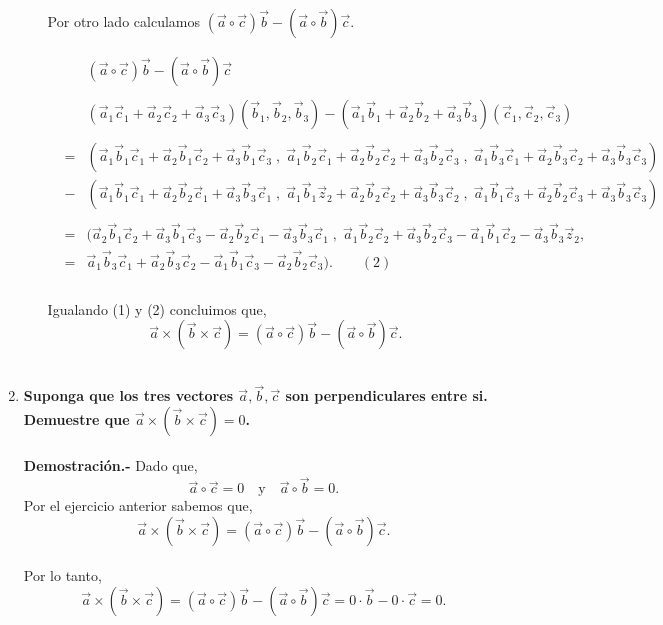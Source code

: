\begin{enumerate}
\begin{enumerate}[a)]
		Por otro lado calculamos $\left(\vec{a}\circ \vec{c}\right)\vec{b}-\left(\vec{a}\circ \vec{b}\right)\vec{c}$.

		$$\begin{array}{rcl}
		    &&\left(\vec{a}\circ \vec{c}\right)\vec{b}-\left(\vec{a}\circ \vec{b}\right)\vec{c}\\\\
		    &&(\vec{a}_1\vec{c}_1+\vec{a}_2\vec{c}_2+\vec{a}_3\vec{c}_3)(\vec{b}_1,\vec{b}_2,\vec{b}_3)-(\vec{a}_1\vec{b}_1+\vec{a}_2\vec{b}_2+\vec{a}_3\vec{b}_3)(\vec{c}_1,\vec{c}_2,\vec{c}_3)\\\\
		    &=& (\vec{a}_1\vec{b}_1\vec{c}_1+\vec{a}_2\vec{b}_1\vec{c}_2+\vec{a}_3\vec{b}_1\vec{c}_3\; ,\; \vec{a}_1\vec{b}_2\vec{c}_1+\vec{a}_2\vec{b}_2\vec{c}_2+\vec{a}_3\vec{b}_2\vec{c}_3\; , \; \vec{a}_1\vec{b}_3 \vec{c}_1+\vec{a}_2\vec{b}_3\vec{c}_2+\vec{a}_3\vec{b}_3\vec{c}_3)\\
		    &-&(\vec{a}_1\vec{b}_1\vec{c}_1+\vec{a}_2\vec{b}_2\vec{c}_1+\vec{a}_3\vec{b}_3\vec{c}_1\; , \; \vec{a}_1\vec{b}_1\vec{z}_2+\vec{a}_2\vec{b}_2\vec{c}_2+\vec{a}_3\vec{b}_3\vec{c}_2\; ,\; \vec{a}_1\vec{b}_1\vec{c}_3+\vec{a}_2\vec{b}_2\vec{c}_3+\vec{a}_3\vec{b}_3\vec{c}_3)\\\\
		    &=&(\vec{a}_2\vec{b}_1\vec{c}_2+\vec{a}_3\vec{b}_1\vec{c}_3-\vec{a}_2\vec{b}_2\vec{c}_1-\vec{a}_3\vec{b}_3\vec{c}_1\; , \; \vec{a}_1\vec{b}_2\vec{c}_2+\vec{a}_3\vec{b}_2\vec{c}_3-\vec{a}_1\vec{b}_1\vec{c}_2-\vec{a}_3\vec{b}_3\vec{z}_2 ,\\
		    &=& \vec{a}_1\vec{b}_3\vec{c}_1+ \vec{a}_2\vec{b}_3\vec{c}_2-\vec{a}_1\vec{b}_1\vec{c}_3- \vec{a}_2\vec{b}_2\vec{c}_3). \qquad (2)\\\\
		\end{array}$$

	    Igualando (1) y (2) concluimos que,
	    $$\vec{a}\times \left(\vec{b}\times \vec{c}\right)=\left(\vec{a}\circ \vec{c}\right)\vec{b}-\left(\vec{a}\circ \vec{b}\right)\vec{c}.$$\\

	\end{enumerate}

\item \textbf{\boldmath Suponga que los tres vectores $\vec{a},\vec{b},\vec{c}$ son perpendiculares entre si. Demuestre que $\vec{a}\times (\vec{b}\times \vec{c})=0$.\\\\
    Demostración.-}\; Dado que, 
    $$\vec{a}\circ \vec{c}=0\quad \mbox{y} \quad\vec{a}\circ \vec{b}=0.$$
    Por el ejercicio anterior sabemos que,
	$$\vec{a}\times \left(\vec{b}\times \vec{c}\right)=\left(\vec{a}\circ \vec{c}\right)\vec{b}-\left(\vec{a}\circ \vec{b}\right)\vec{c}.$$\\
	Por lo tanto,
	$$\vec{a}\times \left(\vec{b}\times \vec{c}\right)=\left(\vec{a}\circ \vec{c}\right)\vec{b}-\left(\vec{a}\circ \vec{b}\right)\vec{c}=0\cdot \vec{b}-0\cdot \vec{c}=0.$$\\



\end{enumerate}
